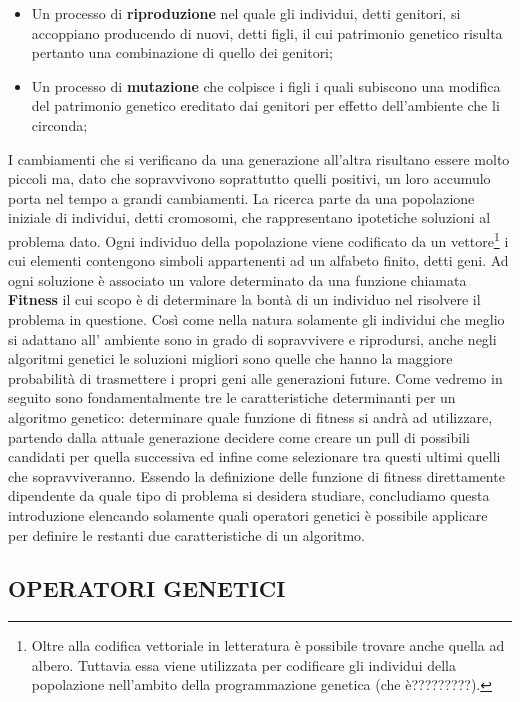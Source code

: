\documentclass[11pt]{article}
\begin{document}
\begin{itemize}
    \item Un processo di \textbf{riproduzione} nel quale gli individui, detti genitori, si accoppiano producendo di nuovi, detti figli, il cui patrimonio genetico risulta pertanto una combinazione di quello dei genitori;
    \item Un processo di \textbf{mutazione} che colpisce i figli i quali subiscono una modifica del patrimonio genetico ereditato dai genitori per effetto dell'ambiente che li circonda;
\end{itemize}

I cambiamenti che si verificano da una generazione all'altra risultano essere molto piccoli ma, dato che sopravvivono soprattutto quelli positivi, un loro accumulo porta nel tempo a grandi cambiamenti.
La ricerca parte da una popolazione iniziale di individui, detti cromosomi, che rappresentano ipotetiche soluzioni al problema dato. Ogni individuo della popolazione viene codificato da un vettore\footnote{Oltre alla codifica vettoriale in letteratura è possibile trovare anche quella ad albero. Tuttavia essa viene utilizzata per codificare gli individui della popolazione nell'ambito della programmazione genetica (che è?????????).} i cui elementi contengono simboli appartenenti ad un alfabeto finito, detti geni. Ad ogni soluzione è associato un valore determinato da una funzione chiamata \textbf{Fitness} il cui scopo è di determinare la bontà di un individuo nel risolvere il problema in questione.
Così come nella natura solamente gli individui che meglio si adattano all' ambiente sono in grado di sopravvivere e riprodursi, anche negli algoritmi genetici le soluzioni migliori sono quelle che hanno la maggiore probabilità di trasmettere i propri geni alle generazioni future.
Come vedremo in seguito sono fondamentalmente tre le caratteristiche determinanti per un algoritmo genetico: determinare quale funzione di fitness si andrà ad utilizzare, partendo dalla attuale generazione decidere come creare un pull di possibili candidati per quella successiva ed infine come selezionare tra questi ultimi quelli che sopravviveranno.
Essendo la definizione delle funzione di fitness direttamente dipendente da quale tipo di problema si desidera studiare, concludiamo questa introduzione elencando solamente quali operatori genetici è possibile applicare per definire le restanti due caratteristiche di un algoritmo.

\subsection*{OPERATORI GENETICI}
\label{sec:OperatoriGeneticiS}
\end{document}
